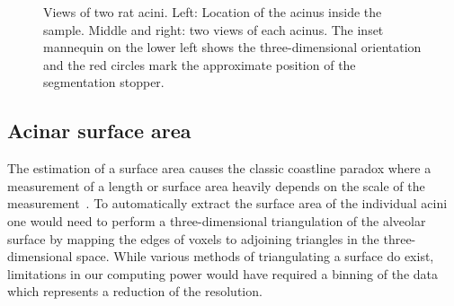 \documentclass[a4paper,DIV=calc,abstract,english]{scrartcl}
\newlength\imagewidth		%
\newlength\imagescale		%
\begin{document}
\begin{figure}[htb]
{%
		}%
	\caption{Views of two rat acini.
		Left: Location of the acinus inside the sample.
		Middle and right: two views of each acinus.
		The inset mannequin on the lower left shows the three-dimensional orientation and the red circles mark the approximate position of the segmentation stopper.}
	\label{fig:acini}
\end{figure}

\subsection{Acinar surface area}\label{sec:results:acinar surface area}
The estimation of a surface area causes the classic coastline paradox where a measurement of a length or surface area heavily depends on the scale of the measurement~\citep{Mandelbrot1967a}.
To automatically extract the surface area of the individual acini one would need to perform a three-dimensional triangulation of the alveolar surface by mapping the edges of voxels to adjoining triangles in the three-dimensional space.
While various methods of triangulating a surface do exist, limitations in our computing power would have required a binning of the data which represents a reduction of the resolution.
\end{document}
